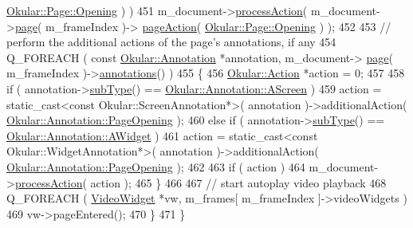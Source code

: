 \begin{DoxyCode}
      \hyperlink{classOkular_1_1Page_a6a8e241cdb604d5c90d5f80b169788f7adbcb6b79c0b2118ed23a0d1c89391f87}{Okular::Page::Opening} ) )
451             m\_document->\hyperlink{classOkular_1_1Document_aabdf41f40fe0391590391e303891b5ed}{processAction}( m\_document->\hyperlink{classOkular_1_1Document_a1c95c2f192d739c217d00971da48f69d}{page}( m\_frameIndex )->
      \hyperlink{classOkular_1_1Page_a960c4dd29f12aaabaa66880c19540203}{pageAction}( \hyperlink{classOkular_1_1Page_a6a8e241cdb604d5c90d5f80b169788f7adbcb6b79c0b2118ed23a0d1c89391f87}{Okular::Page::Opening} ) );
452 
453         \textcolor{comment}{// perform the additional actions of the page's annotations, if any}
454         Q\_FOREACH ( \textcolor{keyword}{const} \hyperlink{classOkular_1_1Annotation}{Okular::Annotation} *annotation, m\_document->
      \hyperlink{classOkular_1_1Document_a1c95c2f192d739c217d00971da48f69d}{page}( m\_frameIndex )->\hyperlink{classOkular_1_1Page_ad82e0f26d5435b5ccfa3d23c359ac23c}{annotations}() )
455         \{
456             \hyperlink{classOkular_1_1Action}{Okular::Action} *action = 0;
457 
458             \textcolor{keywordflow}{if} ( annotation->\hyperlink{classOkular_1_1Annotation_af9833449767eacd740f377e69a1fdd48}{subType}() == \hyperlink{classOkular_1_1Annotation_af71b46e37d5f850b97d5c4de3be9aac0a7cf8ba374ec139a8e2fb47a36182fa32}{Okular::Annotation::AScreen} )
459                 action = static\_cast<const Okular::ScreenAnnotation*>( annotation )->additionalAction( 
      \hyperlink{classOkular_1_1Annotation_aa34152e337b1cb13e9327f37fc295057a46ab9d0c7ed65157b6982a807975b7f0}{Okular::Annotation::PageOpening} );
460             \textcolor{keywordflow}{else} \textcolor{keywordflow}{if} ( annotation->\hyperlink{classOkular_1_1Annotation_af9833449767eacd740f377e69a1fdd48}{subType}() == 
      \hyperlink{classOkular_1_1Annotation_af71b46e37d5f850b97d5c4de3be9aac0aa0f6a560b971fe69d18156176258d6c8}{Okular::Annotation::AWidget} )
461                 action = static\_cast<const Okular::WidgetAnnotation*>( annotation )->additionalAction( 
      \hyperlink{classOkular_1_1Annotation_aa34152e337b1cb13e9327f37fc295057a46ab9d0c7ed65157b6982a807975b7f0}{Okular::Annotation::PageOpening} );
462 
463             \textcolor{keywordflow}{if} ( action )
464                 m\_document->\hyperlink{classOkular_1_1Document_aabdf41f40fe0391590391e303891b5ed}{processAction}( action );
465         \}
466 
467         \textcolor{comment}{// start autoplay video playback}
468         Q\_FOREACH ( \hyperlink{classVideoWidget}{VideoWidget} *vw, m\_frames[ m\_frameIndex ]->videoWidgets )
469             vw->pageEntered();
470     \}
471 \}
\end{DoxyCode}
